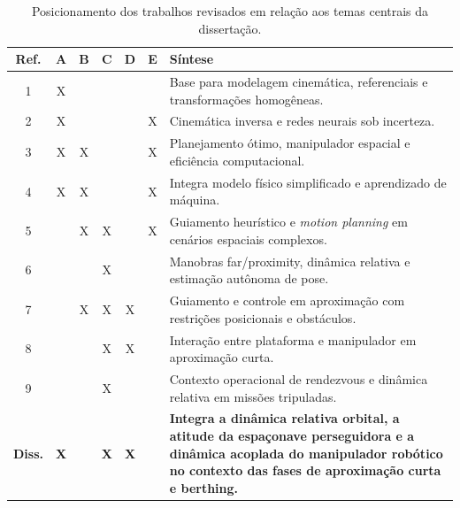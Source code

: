 \begin{table}[H]
\centering
\caption{Posicionamento dos trabalhos revisados em relação aos temas centrais da dissertação.}
\label{tab_posicionamento_literatura}
\scriptsize
\renewcommand{\arraystretch}{1.3}
\begin{tabular}{|c|c|c|c|c|c|p{10cm}|}
\hline
\textbf{Ref.} & \textbf{A} & \textbf{B} & \textbf{C} & \textbf{D} & \textbf{E} & \textbf{Síntese} \\
\hline
1 & X &  &  &  &  & Base para modelagem cinemática, referenciais e transformações homogêneas. \\
\hline
2 & X &  &  &  & X & Cinemática inversa e redes neurais sob incerteza. \\
\hline
3 & X & X &  &  & X & Planejamento ótimo, manipulador espacial e eficiência computacional. \\
\hline
4 & X & X &  &  & X & Integra modelo físico simplificado e aprendizado de máquina. \\
\hline
5 &  & X & X &  & X & Guiamento heurístico e \textit{motion planning} em cenários espaciais complexos. \\
\hline
6 &  &  & X &  &  & Manobras far/proximity, dinâmica relativa e estimação autônoma de pose. \\
\hline
7 &  & X & X & X &  & Guiamento e controle em aproximação com restrições posicionais e obstáculos. \\
\hline
8 &  &  & X & X &  & Interação entre plataforma e manipulador em aproximação curta. \\
\hline
9 &  &  & X &  &  & Contexto operacional de rendezvous e dinâmica relativa em missões tripuladas. \\
\hline
\textbf{Diss.} & \textbf{X} &  & \textbf{X} & \textbf{X} &  & \textbf{Integra a dinâmica relativa orbital, a atitude da espaçonave perseguidora e a dinâmica acoplada do manipulador robótico no contexto das fases de aproximação curta e berthing.} \\
\hline
\end{tabular}
\end{table}


